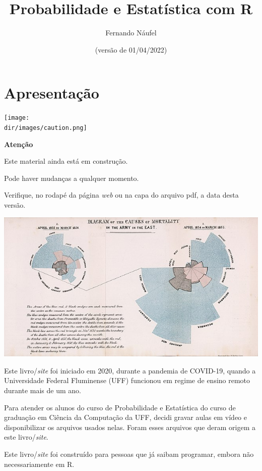 \documentclass[
  11pt]{report}
\title{Probabilidade e Estatística com R}
\author{Fernando Náufel}
\date{(versão de 01/04/2022)}
\newcommand{\dir}{/ssd/R/x86_64-pc-linux-gnu-library/4.1/fnaufelRmd/rmarkdown/resources}
\newenvironment{rmdcaution}
{
  \begin{mycaution}
    \texttt{[image: \\dir/images/caution.png]}
    \tcblower
  }
  {
  \end{mycaution}
}
\begin{document}
\maketitle

{
\setcounter{tocdepth}{1}
\tableofcontents
}
\hypertarget{apresentacao}{%
\chapter*{Apresentação}\label{apresentacao}}

\begin{rmdcaution}
\textbf{Atenção}

Este material ainda está em construção.

Pode haver mudanças a qualquer momento.

Verifique, no rodapé da página \emph{web} ou na capa do arquivo pdf, a data desta versão.

\end{rmdcaution}

\newpage

\includegraphics{images/640px-Nightingale-mortality.jpg}

\vspace{2cm}

Este livro/\emph{site} foi iniciado em 2020, durante a pandemia de COVID-19, quando a Universidade Federal Fluminense (UFF) funcionou em regime de ensino remoto durante mais de um ano.

Para atender os alunos do curso de Probabilidade e Estatística do curso de graduação em Ciência da Computação da UFF, decidi gravar aulas em vídeo e disponibilizar os arquivos usados nelas. Foram esses arquivos que deram origem a este livro/\emph{site}.

Este livro/\emph{site} foi construído para pessoas que já saibam programar, embora não necessariamente em R.
\end{document}
